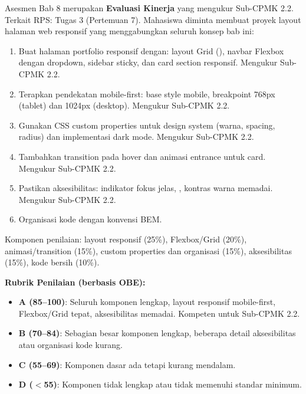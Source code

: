 \documentclass[../main.tex]{subfiles}
\begin{document}
\begin{asesmen}
Asesmen Bab 8 merupakan \textbf{Evaluasi Kinerja} yang mengukur Sub-CPMK 2.2. Terkait RPS: Tugas 3 (Pertemuan 7). Mahasiswa diminta membuat proyek layout halaman web responsif yang menggabungkan seluruh konsep bab ini:
\begin{enumerate}
  \item Buat halaman portfolio responsif dengan: layout Grid (), navbar Flexbox dengan dropdown, sidebar sticky, dan card section responsif. Mengukur Sub-CPMK 2.2.
  \item Terapkan pendekatan mobile-first: base style mobile, breakpoint 768px (tablet) dan 1024px (desktop). Mengukur Sub-CPMK 2.2.
  \item Gunakan CSS custom properties untuk design system (warna, spacing, radius) dan implementasi dark mode. Mengukur Sub-CPMK 2.2.
  \item Tambahkan transition pada hover dan animasi entrance untuk card. Mengukur Sub-CPMK 2.2.
  \item Pastikan aksesibilitas: indikator fokus jelas, , kontras warna memadai. Mengukur Sub-CPMK 2.2.
  \item Organisasi kode dengan konvensi BEM.
\end{enumerate}

Komponen penilaian: layout responsif (25\%), Flexbox/Grid (20\%), animasi/transition (15\%), custom properties dan organisasi (15\%), aksesibilitas (15\%), kode bersih (10\%).

\textbf{Rubrik Penilaian (berbasis OBE):}
\begin{itemize}
  \item \textbf{A (85--100)}: Seluruh komponen lengkap, layout responsif mobile-first, Flexbox/Grid tepat, aksesibilitas memadai. Kompeten untuk Sub-CPMK 2.2.
  \item \textbf{B (70--84)}: Sebagian besar komponen lengkap, beberapa detail aksesibilitas atau organisasi kode kurang.
  \item \textbf{C (55--69)}: Komponen dasar ada tetapi kurang mendalam.
  \item \textbf{D ($<$55)}: Komponen tidak lengkap atau tidak memenuhi standar minimum.
\end{itemize}
\end{asesmen}
\end{document}
